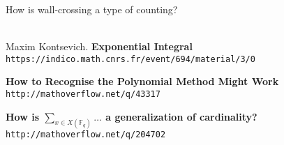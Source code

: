 \documentclass[12pt]{article}
\begin{document}
\noindent How is wall-crossing a type of counting? \\ \\




\newpage

\selectfont \fontsize{12}{10}\selectfont

\begin{thebibliography}{}



\item Maxim Kontsevich.  \textbf{Exponential Integral} \texttt{https://indico.math.cnrs.fr/event/694/material/3/0}
\item \textbf{How to Recognise the Polynomial Method Might Work} \texttt{http://mathoverflow.net/q/43317}

\item \textbf{How is $ \sum_{x \in X(\mathbb{F}_q)} \dots $ a generalization of cardinality?}\hspace{1.6em} \texttt{http://mathoverflow.net/q/204702}

\end{thebibliography}
\end{document}
